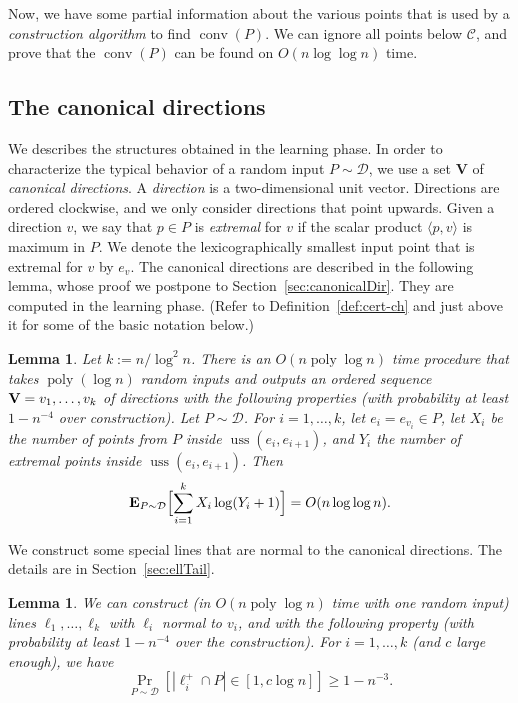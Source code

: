 \documentclass[letterpaper,11pt]{article}
\newtheorem{lemma}[theorem]{Lemma}
\newcommand{\eqdef}{:=}
\newcommand{\EX}{\hbox{\bf E}}
\DeclareMathOperator{\UH}{conv}
\DeclareMathOperator{\poly}{poly}
\DeclareMathOperator{\uss}{uss}
\newcommand{\cC}{\mathcal{C}}
\newcommand{\cD}{\mathcal{D}}
\begin{document}
Now, we have some partial information about 
the various points that is used by
a \emph{construction algorithm} to find $\UH(P)$. We can ignore all points below $\cC$,
and prove that the $\UH(P)$ can be found on $O(n\log \log n)$ time.

\subsection{The canonical directions}\label{sec:prelim_CH}

We describes the structures obtained 
in the learning phase.  In order 
to characterize the typical behavior 
of a random input $P \sim \cD$,
we use a set $\textbf{V}$ of 
\emph{canonical directions}. A 
\emph{direction} is a two-dimensional 
unit vector. Directions are ordered 
clockwise, and we only consider 
directions that point upwards. Given 
a direction $v$, we say that 
$p \in P$ is \emph{extremal} for $v$ 
if the scalar product 
$\langle p,v \rangle$ is maximum 
in $P$. We denote the 
lexicographically smallest input 
point that is extremal for $v$ 
by $e_v$.  The canonical directions 
are described in the following lemma, 
whose proof we postpone to 
Section~\ref{sec:canonicalDir}. They 
are computed in the learning phase. 
(Refer to Definition~\ref{def:cert-ch} 
and just above it for some of the 
basic notation below.)

\begin{lemma}\label{lem:canonicalDir}
  Let $k \eqdef n/\log^2 n$. There 
  is an $O(n\poly\log n)$ time procedure
  that takes $\poly(\log n)$ random inputs 
  and outputs an ordered sequence 
  $\textup{\textbf{V}} = v_1, \dots, v_k$ of 
  directions with the following
  properties (with probability at least 
  $1 - n^{-4}$ over construction). Let $P \sim \cD$.
  For $i = 1, \ldots, k$,  let $e_{i} = e_{v_i} \in P$, 
  let $X_i$ be the number of points  from $P$
  inside $\uss(e_{i}, e_{{i+1}})$, 
  and $Y_i$ the number of \emph{extremal}
  points inside $\uss(e_{i}, e_{{i+1}})$.
  Then
  \[
    \EX_{P \sim \cD}\Bigl[\sum_{i=1}^k X_i \log(Y_i + 1)\Bigr] = 
    O(n \log\log n).
  \]
\end{lemma}

We construct some special lines 
that are normal to the canonical directions.
The details are 
in Section~\ref{sec:ellTail}.

\begin{lemma}\label{lem:ellTail} 
  We can construct (in $O(n\poly\log n)$ time 
  with one random input) lines 
  $\ell_1, \dots, \ell_k$ with
  $\ell_i$ normal to $v_i$, and with 
  the following property (with probability 
  at least $1 - n^{-4}$ over the construction). 
  For $i = 1, \ldots, k$ (and $c$ large 
  enough), we have
  \[
    \Pr_{P \sim \cD}[|\ell_i^+ \cap P| \in [1, c\log n]] \geq 1 - n^{-3}.
  \]
\end{lemma}
\end{document}
